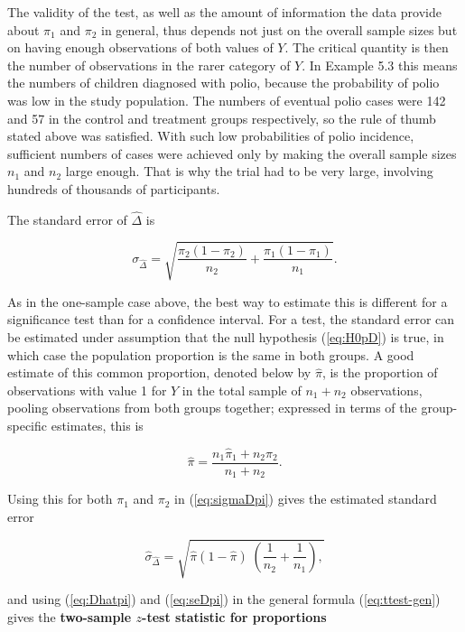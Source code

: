 \documentclass[11pt,a4paper,openany]{book}
\begin{document}
The validity of the test, as well as the amount of information the data
provide about \(\pi_{1}\) and \(\pi_{2}\) in general, thus depends not
just on the overall sample sizes but on having enough observations of
both values of \(Y\). The critical quantity is then the number of
observations in the rarer category of \(Y\). In Example 5.3 this means
the numbers of children diagnosed with polio, because the probability of
polio was low in the study population. The numbers of eventual polio
cases were 142 and 57 in the control and treatment groups respectively,
so the rule of thumb stated above was satisfied. With such low
probabilities of polio incidence, sufficient numbers of cases were
achieved only by making the overall sample sizes \(n_{1}\) and \(n_{2}\)
large enough. That is why the trial had to be very large, involving
hundreds of thousands of participants.

The standard error of \(\hat{\Delta}\) is

\begin{equation}\sigma_{\hat{\Delta}} =
\sqrt{
\frac{\pi_{2}(1-\pi_{2})}{n_{2}}
+\frac{\pi_{1}(1-\pi_{1})}{n_{1}}
}.
\label{eq:sigmaDpi}\end{equation}

As in the one-sample case above, the best way to estimate this is
different for a significance test than for a confidence interval. For a
test, the standard error can be estimated under assumption that the null
hypothesis (\ref{eq:H0pD}) is true, in which case the population
proportion is the same in both groups. A good estimate of this common
proportion, denoted below by \(\hat{\pi}\), is the proportion of
observations with value 1 for \(Y\) in the total sample of
\(n_{1}+n_{2}\) observations, pooling observations from both groups
together; expressed in terms of the group-specific estimates, this is

\begin{equation}\hat{\pi} = \frac{n_{1}\hat{\pi}_{1}+n_{2}\hat{\pi}_{2}}{n_{1}+n_{2}}.
\label{eq:phat2sample}\end{equation}

Using this for both \(\pi_{1}\) and \(\pi_{2}\) in (\ref{eq:sigmaDpi})
gives the estimated standard error

\begin{equation}\hat{\sigma}_{\hat{\Delta}}=
\sqrt{
\hat{\pi}(1-\hat{\pi}) \; \left(
\frac{1}{n_{2}}+
\frac{1}{n_{1}}
\right),
}
\label{eq:seDpi}\end{equation}

and using (\ref{eq:Dhatpi}) and (\ref{eq:seDpi}) in the general formula
(\ref{eq:ttest-gen}) gives the \textbf{two-sample \(z\)-test statistic
for proportions}
\end{document}
